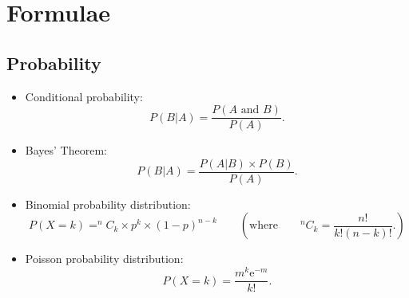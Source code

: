 \documentclass[a4paper,12pt]{article}
\begin{document}




\newpage
\section*{Formulae}
\subsection*{Probability}
\begin{itemize}

\item Conditional probability:
\begin{equation*}
P(B|A)=\frac{P\left( A\text{ and }B\right) }{P\left( A\right) }.
\end{equation*}


\item Bayes' Theorem:
\begin{equation*}
P(B|A)=\frac{P\left(A|B\right) \times P(B) }{P\left( A\right) }.
\end{equation*}


\item Binomial probability distribution:
\begin{equation*}
P(X = k) = ^{n}C_{k} \times p^{k} \times \left( 1-p\right) ^{n-k}\qquad \left( \text{where}\qquad
^{n}C_{k} =\frac{n!}{k!\left(n-k\right) !}. \right)
\end{equation*}

\item Poisson probability distribution:
\begin{equation*}
P(X = k) =\frac{m^{k}\mathrm{e}^{-m}}{k!}.
\end{equation*}
\end{itemize}
\end{document}
